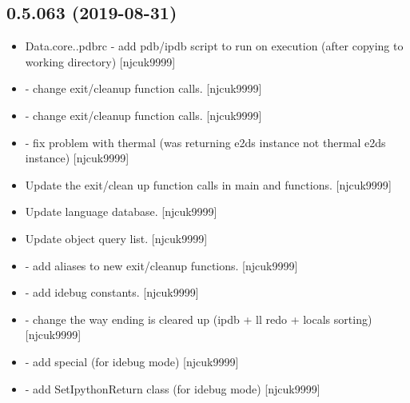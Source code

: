 \documentclass[a4paper,10pt,english]{report}
\begin{document}
\subsection{0.5.063 (2019-08-31)}
\label{\detokenize{misc/changelog:id80}}\begin{itemize}
\item {} 
Data.core..pdbrc - add pdb/ipdb script to run on execution (after
copying to working directory) {[}njcuk9999{]}

\item {} 
 - change exit/cleanup function
calls. {[}njcuk9999{]}

\item {} 
 - change exit/cleanup function calls.
{[}njcuk9999{]}

\item {} 
 - fix problem with thermal (was returning
e2ds instance not thermal e2ds instance) {[}njcuk9999{]}

\item {} 
Update the exit/clean up function calls in main and 
functions. {[}njcuk9999{]}

\item {} 
Update language database. {[}njcuk9999{]}

\item {} 
Update object query list. {[}njcuk9999{]}

\item {} 
 - add aliases to new exit/cleanup functions.
{[}njcuk9999{]}

\item {} 
 - add idebug constants.
{[}njcuk9999{]}

\item {} 
 - change the way ending is cleared up (ipdb +
ll redo + locals sorting) {[}njcuk9999{]}

\item {} 
 - add special  (for idebug
mode) {[}njcuk9999{]}

\item {} 
 - add SetIpythonReturn class (for idebug
mode) {[}njcuk9999{]}


\end{itemize}
\end{document}
